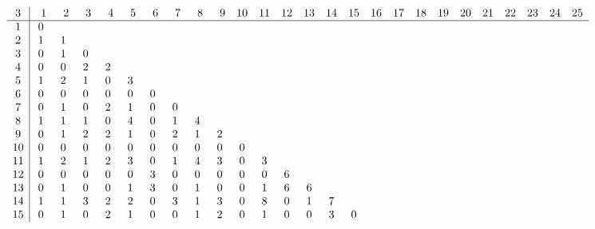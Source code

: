 \begin{landscape}
\[
\begin{array}{c|ccccccccccccccccccccccccc}\addcontentsline{lot}{table}{\protect\numberline{}Dimensions of the Kernel of $\mathcal{L}_{r,c,3}$}
 3&  \phantom{0}1&  \phantom{0}2&  \phantom{0}3&  \phantom{0}4&  \phantom{0}5&  \phantom{0}6&  \phantom{0}7&  \phantom{0}8&  \phantom{0}9& 10& 11& 12& 13& 14& 15& 16& 17& 18& 19& 20& 21& 22& 23& 24& 25\\
\hline
 1&  0&   &   &   &   &   &   &   &   &   &   &   &   &   &   &   &   &   &   &   &   &   &   &   &   \\
 2&  1&  1&   &   &   &   &   &   &   &   &   &   &   &   &   &   &   &   &   &   &   &   &   &   &   \\
 3&  0&  1&  0&   &   &   &   &   &   &   &   &   &   &   &   &   &   &   &   &   &   &   &   &   &   \\
 4&  0&  0&  2&  2&   &   &   &   &   &   &   &   &   &   &   &   &   &   &   &   &   &   &   &   &   \\
 5&  1&  2&  1&  0&  3&   &   &   &   &   &   &   &   &   &   &   &   &   &   &   &   &   &   &   &   \\
 6&  0&  0&  0&  0&  0&  0&   &   &   &   &   &   &   &   &   &   &   &   &   &   &   &   &   &   &   \\
 7&  0&  1&  0&  2&  1&  0&  0&   &   &   &   &   &   &   &   &   &   &   &   &   &   &   &   &   &   \\
 8&  1&  1&  1&  0&  4&  0&  1&  4&   &   &   &   &   &   &   &   &   &   &   &   &   &   &   &   &   \\
 9&  0&  1&  2&  2&  1&  0&  2&  1&  2&   &   &   &   &   &   &   &   &   &   &   &   &   &   &   &   \\
10&  0&  0&  0&  0&  0&  0&  0&  0&  0&  0&   &   &   &   &   &   &   &   &   &   &   &   &   &   &   \\
11&  1&  2&  1&  2&  3&  0&  1&  4&  3&  0&  3&   &   &   &   &   &   &   &   &   &   &   &   &   &   \\
12&  0&  0&  0&  0&  0&  3&  0&  0&  0&  0&  0&  6&   &   &   &   &   &   &   &   &   &   &   &   &   \\
13&  0&  1&  0&  0&  1&  3&  0&  1&  0&  0&  1&  6&  6&   &   &   &   &   &   &   &   &   &   &   &   \\
14&  1&  1&  3&  2&  2&  0&  3&  1&  3&  0&  8&  0&  1&  7&   &   &   &   &   &   &   &   &   &   &   \\
15&  0&  1&  0&  2&  1&  0&  0&  1&  2&  0&  1&  0&  0&  3&  0&   &   &   &   &   &   &   &   &   &   \\

\end{array}\]
\end{landscape}

